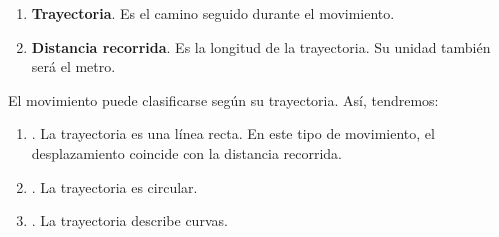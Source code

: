 \begin{enumerate}[label=\numberballmDarkTeal]
        \begin{remark}
            Aquí es importante señalar que el desplazamiento puede ser \textbf{negativo}.
            Esto ocurre cuando el objeto en movimiento se desplaza en sentido contrario.
        \end{remark}

        \item \textbf{Trayectoria}.
        Es el camino seguido durante el movimiento.

        \item \textbf{Distancia recorrida}.
        Es la longitud de la trayectoria.
        Su unidad también será el metro.
\end{enumerate}

El movimiento puede clasificarse según su trayectoria.
Así, tendremos:
\begin{enumerate}[label=\letraminuscula]
        \item {}.
        La trayectoria es una línea recta.
        En este tipo de movimiento, el desplazamiento coincide con la distancia recorrida.
        \item {}.
        La trayectoria es circular.
        \item {}.
        La trayectoria describe curvas.
\end{enumerate}

